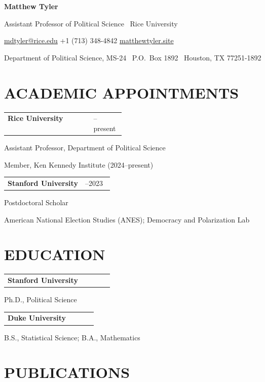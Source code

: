 \documentclass[11pt,a4paper]{article}
\makeatletter
\newcommand{\cvrow}[2]{%
  \noindent\begin{tabularx}{\linewidth}{@{}X>{\raggedleft\arraybackslash}p{0.27\linewidth}@{}}
  #1 & #2
  \end{tabularx}\par
}
\makeatother
\begin{document}
\begin{center}
  {\LARGE\bfseries Matthew Tyler}\par\vspace{0.25em}
  Assistant Professor of Political Science \textbullet\ Rice University\par\vspace{0.3em}
  \href{mailto:mdtyler@rice.edu}{mdtyler@rice.edu}
  \quad\textbar\quad +1 (713) 348-4842
  \quad\textbar\quad \href{https://matthewtyler.site}{matthewtyler.site}\par\vspace{0.2em}
  {\small Department of Political Science, MS-24 \textbullet\ P.O.~Box 1892
  \textbullet\ Houston, TX 77251-1892}
\end{center}

\section{ACADEMIC APPOINTMENTS}
\cvrow{\textbf{Rice University}}{2023--present}
Assistant Professor, Department of Political Science\par
Member, Ken Kennedy Institute (2024--present)\par
\medskip
\cvrow{\textbf{Stanford University}}{2021--2023}
Postdoctoral Scholar\par
American National Election Studies (ANES); Democracy and Polarization Lab


\section{EDUCATION}
\cvrow{\textbf{Stanford University}}{2021}
Ph.D., Political Science\par
\smallskip
\cvrow{\textbf{Duke University}}{2015}
B.S., Statistical Science; B.A., Mathematics

\section{PUBLICATIONS}
\end{document}
